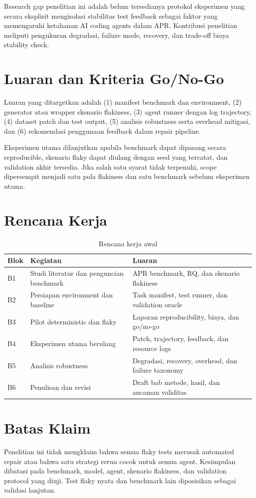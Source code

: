 Research gap penelitian ini adalah belum tersedianya protokol eksperimen yang secara eksplisit mengisolasi stabilitas test feedback sebagai faktor yang memengaruhi ketahanan AI coding agents dalam APR. Kontribusi penelitian meliputi pengukuran degradasi, failure mode, recovery, dan trade-off biaya stability check.

\section{Luaran dan Kriteria Go/No-Go}

Luaran yang ditargetkan adalah (1) manifest benchmark dan environment, (2) generator atau wrapper skenario flakiness, (3) agent runner dengan log trajectory, (4) dataset patch dan test output, (5) analisis robustness serta overhead mitigasi, dan (6) rekomendasi penggunaan feedback dalam repair pipeline.

Eksperimen utama dilanjutkan apabila benchmark dapat dipasang secara reproducible, skenario flaky dapat diulang dengan seed yang tercatat, dan validation akhir tersedia. Jika salah satu syarat tidak terpenuhi, scope dipersempit menjadi satu pola flakiness dan satu benchmark sebelum eksperimen utama.

\section{Rencana Kerja}

\begin{table}[htbp]
\centering
\small
\caption{Rencana kerja awal}
\label{tab:schedule}
\begin{tabularx}{\textwidth}{p{1.1cm}p{4.2cm}Y}
\toprule
\textbf{Blok} & \textbf{Kegiatan} & \textbf{Luaran} \\
\midrule
B1 & Studi literatur dan penguncian benchmark & APR benchmark, RQ, dan skenario flakiness \\
B2 & Persiapan environment dan baseline & Task manifest, test runner, dan validation oracle \\
B3 & Pilot deterministic dan flaky & Laporan reproducibility, biaya, dan go/no-go \\
B4 & Eksperimen utama berulang & Patch, trajectory, feedback, dan resource logs \\
B5 & Analisis robustness & Degradasi, recovery, overhead, dan failure taxonomy \\
B6 & Penulisan dan revisi & Draft bab metode, hasil, dan ancaman validitas \\
\bottomrule
\end{tabularx}
\end{table}

\section{Batas Klaim}

Penelitian ini tidak mengklaim bahwa semua flaky tests merusak automated repair atau bahwa satu strategi rerun cocok untuk semua agent. Kesimpulan dibatasi pada benchmark, model, agent, skenario flakiness, dan validation protocol yang diuji. Test flaky nyata dan benchmark lain diposisikan sebagai validasi lanjutan.
